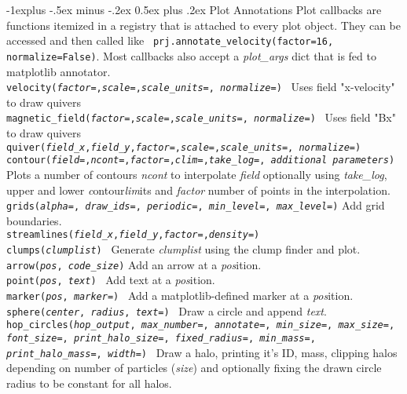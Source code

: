 \documentclass[10pt,landscape]{article}
\makeatletter
\renewcommand{\subsection}{\@startsection{subsection}{2}{0mm}%
                                {-1explus -.5ex minus -.2ex}%
                                {0.5ex plus .2ex}%
                                {\normalfont\normalsize\bfseries}}
\makeatother
\begin{document}
\begin{multicols}{3}
\subsection{Plot Annotations}
Plot callbacks are functions itemized in a registry that is attached to every plot object. They can be accessed and then called like \texttt{ prj.annotate\_velocity(factor=16, normalize=False)}. Most callbacks also accept a \textit{plot\_args} dict that is fed to matplotlib annotator. \\
\texttt{velocity(\textit{factor=},\textit{scale=},\textit{scale\_units=}, \textit{normalize=})} \textemdash\ Uses field "x-velocity" to draw quivers\\
\texttt{magnetic\_field(\textit{factor=},\textit{scale=},\textit{scale\_units=}, \textit{normalize=})} \textemdash\ Uses field "Bx" to draw quivers\\
\texttt{quiver(\textit{field\_x},\textit{field\_y},\textit{factor=},\textit{scale=},\textit{scale\_units=}, \textit{normalize=})} \\
\texttt{contour(\textit{field=},\textit{ncont=},\textit{factor=},\textit{clim=},\textit{take\_log=}, \textit{additional parameters})} \textemdash Plots a number of contours \textit{ncont} to interpolate \textit{field} optionally using \textit{take\_log}, upper and lower \textit{c}ontour\textit{lim}its and \textit{factor} number of points in the interpolation.\\
\texttt{grids(\textit{alpha=}, \textit{draw\_ids=}, \textit{periodic=}, \textit{min\_level=}, \textit{max\_level=})} \textemdash Add grid boundaries. \\
\texttt{streamlines(\textit{field\_x},\textit{field\_y},\textit{factor=},\textit{density=})}\\
\texttt{clumps(\textit{clumplist})} \textemdash\ Generate \textit{clumplist} using the clump finder and plot. \\
\texttt{arrow(\textit{pos}, \textit{code\_size})} Add an arrow at a \textit{pos}ition. \\
\texttt{point(\textit{pos}, \textit{text})} \textemdash\ Add text at a \textit{pos}ition. \\
\texttt{marker(\textit{pos}, \textit{marker=})} \textemdash\ Add a matplotlib-defined marker at a \textit{pos}ition. \\
\texttt{sphere(\textit{center}, \textit{radius}, \textit{text=})} \textemdash\ Draw a circle and append \textit{text}.\\
\texttt{hop\_circles(\textit{hop\_output}, \textit{max\_number=}, \textit{annotate=}, \textit{min\_size=}, \textit{max\_size=}, \textit{font\_size=}, \textit{print\_halo\_size=}, \textit{fixed\_radius=}, \textit{min\_mass=}, \textit{print\_halo\_mass=}, \textit{width=})} \textemdash\ Draw a halo, printing it's ID, mass, clipping halos depending on number of particles (\textit{size}) and optionally fixing the drawn circle radius to be constant for all halos.\\

\end{multicols}
\end{document}
